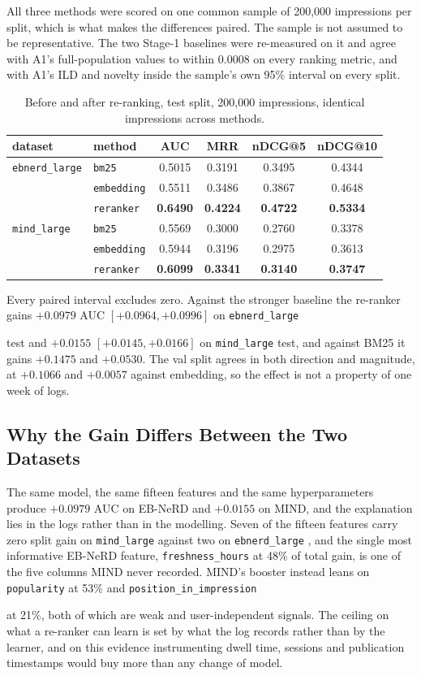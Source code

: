 \documentclass[11pt]{article}
\newcommand{\code}[1]{%
    \colorbox{gray!40}{\texttt{#1}}%
}
\begin{document}
All three methods were scored on one common sample of 200,000 impressions per
split, which is what makes the differences paired. The sample is not assumed
to be representative. The two Stage-1 baselines were re-measured on it and
agree with A1's full-population values to within 0.0008 on every ranking
metric, and with A1's ILD and novelty inside the sample's own 95\% interval on
every split.

\begin{table}[h]
\centering
\begin{tabular}{llcccc}
\toprule
dataset & method & AUC & MRR & nDCG@5 & nDCG@10 \\
\midrule
\code{ebnerd\_large} & \code{bm25} & 0.5015 & 0.3191 & 0.3495 & 0.4344 \\
                     & \code{embedding} & 0.5511 & 0.3486 & 0.3867 & 0.4648 \\
                     & \code{reranker} & \textbf{0.6490} & \textbf{0.4224} & \textbf{0.4722} & \textbf{0.5334} \\
\midrule
\code{mind\_large}   & \code{bm25} & 0.5569 & 0.3000 & 0.2760 & 0.3378 \\
                     & \code{embedding} & 0.5944 & 0.3196 & 0.2975 & 0.3613 \\
                     & \code{reranker} & \textbf{0.6099} & \textbf{0.3341} & \textbf{0.3140} & \textbf{0.3747} \\
\bottomrule
\end{tabular}
\caption{Before and after re-ranking, test split, 200,000 impressions,
identical impressions across methods.}
\end{table}

Every paired interval excludes zero. Against the stronger baseline the
re-ranker gains $+0.0979$ AUC $[+0.0964, +0.0996]$ on \code{ebnerd\_large}
test and $+0.0155$ $[+0.0145, +0.0166]$ on \code{mind\_large} test, and
against BM25 it gains $+0.1475$ and $+0.0530$. The val split agrees in both
direction and magnitude, at $+0.1066$ and $+0.0057$ against embedding, so the
effect is not a property of one week of logs.

\subsection{Why the Gain Differs Between the Two Datasets}
\label{sec:dataset-gap}

The same model, the same fifteen features and the same hyperparameters produce
$+0.0979$ AUC on EB-NeRD and $+0.0155$ on MIND, and the explanation lies in
the logs rather than in the modelling. Seven of the fifteen features carry
zero split gain on \code{mind\_large} against two on \code{ebnerd\_large}, and
the single most informative EB-NeRD feature, \code{freshness\_hours} at 48\%
of total gain, is one of the five columns MIND never recorded. MIND's booster
instead leans on \code{popularity} at 53\% and \code{position\_in\_impression}
at 21\%, both of which are weak and user-independent signals. The ceiling on
what a re-ranker can learn is set by what the log records rather than by the
learner, and on this evidence instrumenting dwell time, sessions and
publication timestamps would buy more than any change of model.
\end{document}
